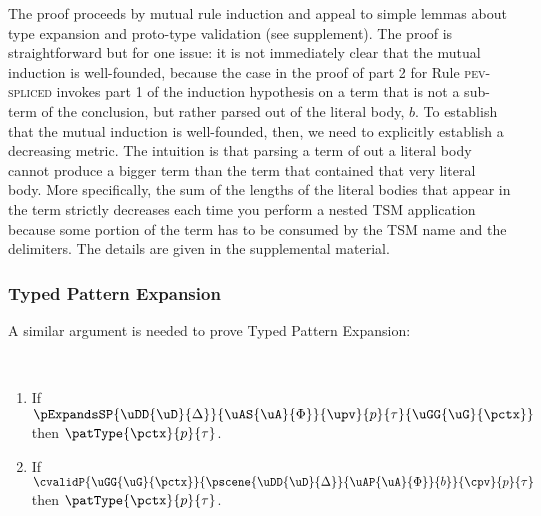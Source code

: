 \documentclass[acmlarge,review,anonymous]{acmart}\settopmatter{printfolios=true}
\begin{document}
The proof proceeds by mutual rule induction and appeal to simple lemmas about type expansion and proto-type validation (see supplement). The proof is straightforward but for one issue: it is not immediately clear that the mutual induction is well-founded, because the case in the proof of part 2 for Rule \textsc{pev-spliced} invokes part 1 of the induction hypothesis on a term that is not a sub-term of the conclusion, but rather parsed out of the literal body, $b$. To establish that the mutual induction is well-founded, then, we need to explicitly establish a decreasing metric. The intuition is that parsing a term of out a literal body cannot produce a bigger term than the term that contained that very literal body. More specifically, {the sum of the lengths of the literal bodies that appear in the term strictly decreases each time you perform a nested TSM application} because some portion of the term has to be consumed by the TSM name and the delimiters. The details are given in the supplemental material.

\subsubsection{Typed Pattern Expansion} A similar argument is needed to prove Typed Pattern Expansion:
\begin{theorem} ~
\begin{enumerate}[nolistsep]
  \item If $\pExpandsSP{\uDD{\uD}{\Delta}}{\uAS{\uA}{\Phi}}{\upv}{p}{\tau}{\uGG{\uG}{\pctx}}$ then $\patType{\pctx}{p}{\tau}$.
  \item If $\cvalidP{\uGG{\uG}{\pctx}}{\pscene{\uDD{\uD}{\Delta}}{\uAP{\uA}{\Phi}}{b}}{\cpv}{p}{\tau}$ then $\patType{\pctx}{p}{\tau}$.
\end{enumerate}
\end{theorem}
\end{document}

